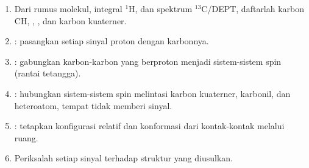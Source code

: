 \begin{method}\label{met:b3:advanced-nmr:solve-2d}
\begin{enumerate}
  \item Dari rumus molekul, integral ${}^1$H, dan spektrum ${}^{13}$C/DEPT,
        daftarlah karbon CH, , , dan karbon kuaterner.
  \item {}: pasangkan setiap sinyal proton dengan karbonnya.
  \item {}: gabungkan karbon-karbon yang berproton menjadi sistem-sistem
        spin (rantai tetangga).
  \item {}: hubungkan sistem-sistem spin melintasi karbon kuaterner,
        karbonil, dan heteroatom, tempat  tidak memberi sinyal.
  \item {}: tetapkan konfigurasi relatif dan konformasi dari kontak-kontak
        melalui ruang.
  \item Periksalah setiap sinyal terhadap struktur yang diusulkan.
\end{enumerate}
\end{method}

